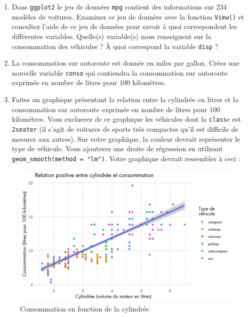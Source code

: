 \documentclass[a4paperpaper,]{article}
\begin{document}
\begin{enumerate}
\def\labelenumi{\arabic{enumi}.}
\item
  Dans \texttt{ggplot2} le jeu de données \texttt{mpg} contient des informations sur 234 modèles de voitures. Examinez ce jeu de données avec la fonction \texttt{View()} et consultez l'aide de ce jeu de données pour savoir à quoi correspondent les différentes variables. Quelle(s) variable(s) nous renseignent sur la consommation des véhicules ? À quoi correspond la variable \texttt{disp} ?
\item
  La consommation sur autoroute est donnée en miles par gallon. Créez une nouvelle variable \texttt{conso} qui contiendra la consommation sur autoroute exprimée en nombre de litres pour 100 kilomètres.
\item
  Faites un graphique présentant la relation entre la cylindrée en litres et la consommation sur autoroute exprimée en nombre de litres pour 100 kilomètres. Vous excluerez de ce graphique les véhicules dont la \texttt{class}e est \texttt{2seater} (il s'agit de voitures de sports très compactes qu'il est difficile de mesurer aux autres). Sur votre graphique, la couleur devrait représenter le type de véhicule. Vous ajouterez une droite de régression en utilisant \texttt{geom\_smooth(method\ =\ "lm")}. Votre graphique devrait ressembler à ceci :
\end{enumerate}

\begin{figure}[htpb]

{\centering \includegraphics[width=0.9\linewidth]{figure/consommation-1} 

}

\caption{Consommation en fonction de la cylindrée}\label{fig:consommation}
\end{figure}
\end{document}
